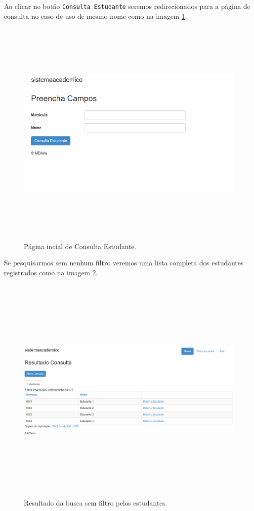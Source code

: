 Ao clicar no botão \texttt{Consulta Estudante} seremos redirecionados para a
página de consulta no caso de uso de mesmo nome como na imagem
\ref{pagina_consulta_estudante}.
\begin{figure}[H]
	\centering
	\includegraphics[width=400pt,height=320pt]{imgs/tutorial-mdarte-0018.png}
	\caption{Página incial de Consulta Estudante.}
	\label{pagina_consulta_estudante}
\end{figure}

Se pesquisarmos sem nenhum filtro veremos uma lista completa dos estudantes
registrados como na imagem \ref{resultado_busca_sem_filtro}.
\begin{figure}[H]
	\centering
	\includegraphics[width=500pt,height=320pt]{imgs/tutorial-mdarte-0020.png}
	\caption{Resultado da busca sem filtro pelos estudantes.}
	\label{resultado_busca_sem_filtro}
\end{figure}